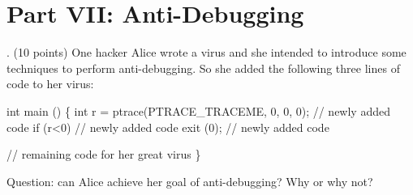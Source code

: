 \documentclass[a4paper, 10pt]{article}
\begin{document}
\newpage
\section*{Part VII: Anti-Debugging}
. (10 points) One hacker Alice wrote a virus and
she intended to introduce some techniques to perform
anti-debugging. So she added the following three lines of code
to her virus:
\begin{code}
int main ()
\{
    int r = ptrace(PTRACE\_TRACEME, 0, 0, 0);   // newly added code
    if (r<0)                                   // newly added code
      exit (0);                                // newly added code

    // remaining code for her great virus
\}
\end{code}
Question: can Alice achieve her goal of anti-debugging? Why or why not?


\fi
\end{document}
